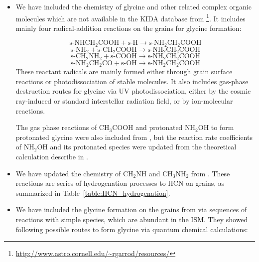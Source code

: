 \documentclass{aastex61}
\begin{document}
\begin{itemize}

\item [1.] We have included the chemistry of glycine and other related complex organic molecules which are not available in the KIDA database from \cite{Garrod13} \footnote{\url{http://www.astro.cornell.edu/~rgarrod/resources/}}. It includes 
mainly four radical-addition reactions on the grains for glycine formation: 

\begin{equation}
\mbox{s-NH}\mbox{CH}_2\mbox{COOH} + \mbox{s-H} \rightarrow  \mbox{s-NH}_2\mbox{CH}_2\mbox{COOH}
\label{Eq1}
\end{equation}
\begin{equation}
\mbox{s-NH}_2 + \mbox{s-CH}_2\mbox{COOH}  \rightarrow  \mbox{s-NH}_2\mbox{CH}_2\mbox{COOH}
\label{Eq2}
\end{equation}
\begin{equation}
\mbox{s-CH}_2\mbox{NH}_2 + \mbox{s-COOH}  \rightarrow  \mbox{s-NH}_2\mbox{CH}_2\mbox{COOH}
\label{Eq3}
\end{equation}
\begin{equation}
\mbox{s-NH}_2\mbox{CH}_2\mbox{CO} + \mbox{s-OH} \rightarrow  \mbox{s-NH}_2\mbox{CH}_2\mbox{COOH}
\label{Eq4}
\end{equation}
These reactant radicals are mainly formed either through grain surface reactions or photodissociation of stable molecules. It also includes gas-phase destruction routes for glycine via UV photodissociation, either by the cosmic ray-induced or standard 
interstellar radiation field, or by ion-molecular reactions.
%

The gas phase reactions of CH$_3$COOH and protonated NH$_2$OH to form protonated glycine were also included from \cite{Garrod13}, but the reaction rate coefficients of NH$_2$OH and its protonated species were updated from the theoretical calculation describe in \cite{Barrientos12}.


\item [2.]  We have updated the chemistry of CH$_2$NH and CH$_3$NH$_2$ from \cite{Suzuki16}. 
%
These reactions are series of hydrogenation processes to HCN on grains, as summarized in Table~\ref{table:HCN_hydrogenation}.




\item [3.] We have included the glycine formation on the grains from \cite{Singh13} via sequences of reactions with simple species, which are abundant in the ISM. They showed following possible routes to form glycine via quantum chemical calculations: 


\end{itemize}
\end{document}
